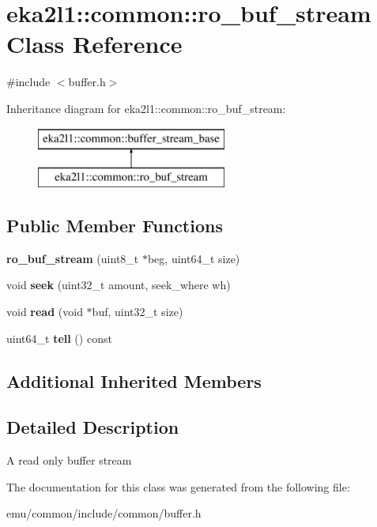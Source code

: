 \hypertarget{classeka2l1_1_1common_1_1ro__buf__stream}{}\section{eka2l1\+:\+:common\+:\+:ro\+\_\+buf\+\_\+stream Class Reference}
\label{classeka2l1_1_1common_1_1ro__buf__stream}


{\ttfamily \#include $<$buffer.\+h$>$}

Inheritance diagram for eka2l1\+:\+:common\+:\+:ro\+\_\+buf\+\_\+stream\+:\begin{figure}[H]
\begin{center}
\leavevmode
\includegraphics[height=2.000000cm]{classeka2l1_1_1common_1_1ro__buf__stream}
\end{center}
\end{figure}
\subsection*{Public Member Functions}
\begin{DoxyCompactItemize}
\item 
\mbox{\label{classeka2l1_1_1common_1_1ro__buf__stream_abfec836d9bc4e9f963d4e0f22a22b1dc}} 
{\bfseries ro\+\_\+buf\+\_\+stream} (uint8\+\_\+t $\ast$beg, uint64\+\_\+t size)
\item 
\mbox{\label{classeka2l1_1_1common_1_1ro__buf__stream_acd583b49a482d766d14905e66d57d780}} 
void {\bfseries seek} (uint32\+\_\+t amount, seek\+\_\+where wh)
\item 
\mbox{\label{classeka2l1_1_1common_1_1ro__buf__stream_afea7040f1a465b4259c700089b6691f1}} 
void {\bfseries read} (void $\ast$buf, uint32\+\_\+t size)
\item 
\mbox{\label{classeka2l1_1_1common_1_1ro__buf__stream_aeaeb96e90096b8e0273b2787589b16a0}} 
uint64\+\_\+t {\bfseries tell} () const
\end{DoxyCompactItemize}
\subsection*{Additional Inherited Members}


\subsection{Detailed Description}
A read only buffer stream 

The documentation for this class was generated from the following file\+:\begin{DoxyCompactItemize}
\item 
emu/common/include/common/buffer.\+h\end{DoxyCompactItemize}
